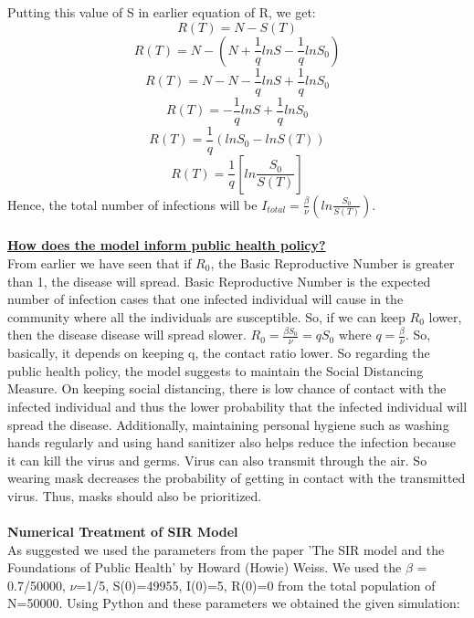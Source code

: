 \documentclass[11pt]{article}
\theoremstyle{definition}
\begin{document}
Putting this value of S in earlier equation of R, we get:
$$R(T) = N-S(T)$$
$$R(T) = N- (N + \frac{1}{q}lnS -\frac{1}{q}lnS_0)$$
$$R(T) = N- N - \frac{1}{q}lnS +\frac{1}{q}lnS_0$$
$$R(T) = - \frac{1}{q}lnS +\frac{1}{q}lnS_0$$
$$R(T)= \frac{1}{q}(lnS_0-lnS(T))$$
$$R(T)= \frac{1}{q}[ln\frac{S_0}{S(T)}]$$
Hence, the total number of infections will be $I_{total}=\frac{\beta}{\nu}(ln\frac{S_0}{S(T)})$.\\
\\




\textbf{\underline{How does the model inform public health policy?}}\\
From earlier we have seen that if $R_0$, the Basic Reproductive Number is greater than 1, the disease will spread. Basic Reproductive Number is the expected number of infection cases that one infected individual will cause in the community where all the individuals are susceptible. So, if we can keep $R_0$ lower, then the disease disease will spread slower. $R_0 = \frac{\beta S_0}{\nu}=qS_0$ where $q = \frac{\beta}{\nu}$. So, basically, it depends on keeping q, the contact ratio lower. So regarding the public health policy, the model suggests to maintain the Social Distancing Measure. On keeping social distancing, there is low chance of contact with the infected individual and thus the lower probability that the infected individual will spread the disease. Additionally, maintaining personal hygiene such as washing hands regularly and using hand sanitizer also helps reduce the infection because it can kill the virus and germs. Virus can also transmit through the air. So wearing mask decreases the probability of getting in contact with the transmitted virus. Thus, masks should also be prioritized.\\
\\

{\textbf{\large Numerical Treatment of SIR Model}}\\

As suggested we used the parameters from the paper 'The SIR model and the Foundations of Public Health' by Howard (Howie) Weiss. We used the $\beta$ = 0.7/50000, $\nu$=1/5, S(0)=49955, I(0)=5, R(0)=0 from the total population of N=50000. Using Python and these parameters we obtained the given simulation:
\end{document}

